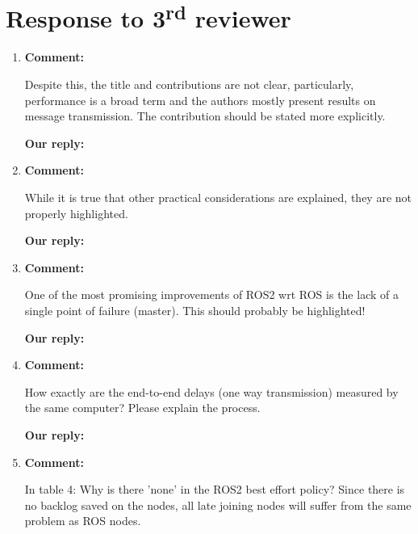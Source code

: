 \documentclass{article}
\newcommand\rd{\textsuperscript{rd}\xspace}
\begin{document}
\newpage


\section{Response to 3\rd reviewer}
\begin{enumerate}

\item \begin{flushleft}
    \textbf{Comment:}
  \end{flushleft}
  Despite this, the title and contributions are not clear, particularly, performance is a broad term and the authors mostly present results on message transmission. The contribution should be stated more explicitly.

  \begin{flushleft}
    \textbf{Our reply:}
  \end{flushleft}


\item \begin{flushleft}
    \textbf{Comment:}
  \end{flushleft}
  While it is true that other practical considerations are explained, they are not properly highlighted.

  \begin{flushleft}
    \textbf{Our reply:}
  \end{flushleft}


\item \begin{flushleft}
    \textbf{Comment:}
  \end{flushleft}
  One of the most promising improvements of ROS2 wrt ROS is the lack of a single point of failure (master). This should probably be highlighted!

  \begin{flushleft}
    \textbf{Our reply:}
  \end{flushleft}


\item \begin{flushleft}
    \textbf{Comment:}
  \end{flushleft}
  How exactly are the end-to-end delays (one way transmission) measured by the same computer? Please explain the process.

  \begin{flushleft}
    \textbf{Our reply:}
  \end{flushleft}


\item \begin{flushleft}
    \textbf{Comment:}
  \end{flushleft}
  In table 4: Why is there 'none' in the ROS2 best effort policy? Since there is no backlog saved on the nodes, all late joining nodes will suffer from the same problem as ROS nodes.


\end{enumerate}
\end{document}
